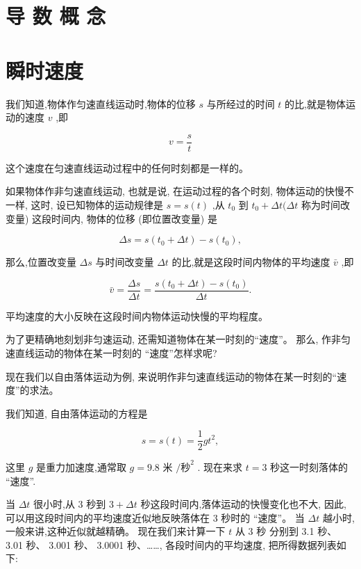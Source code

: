 \documentclass[lang=cn,newtx,12pt,scheme=chinese]{elegantbook}
\begin{document}
\section*{导 数 概 念}

\section{瞬时速度}

我们知道,物体作匀速直线运动时,物体的位移 \(s\) 与所经过的时间 \(t\) 的比,就是物体运动的速度 \(v\) ,即

\[
v = \frac{s}{t}
\]

这个速度在匀速直线运动过程中的任何时刻都是一样的。

如果物体作非匀速直线运动, 也就是说, 在运动过程的各个时刻, 物体运动的快慢不一样, 这时, 设已知物体的运动规律是 \(s = s\left( t\right)\) ,从 \({t}_{0}\) 到 \({t}_{0} + {\Delta t}({\Delta t}\) 称为时间改变量) 这段时间内, 物体的位移 (即位置改变量) 是

\[
{\Delta s} = s\left( {{t}_{0} + {\Delta t}}\right) - s\left( {t}_{0}\right) ,
\]

那么,位置改变量 \({\Delta s}\) 与时间改变量 \({\Delta t}\) 的比,就是这段时间内物体的平均速度 \(\bar{v}\) ,即

\[
\bar{v} = \frac{\Delta s}{\Delta t} = \frac{s\left( {{t}_{0} + {\Delta t}}\right) - s\left( {t}_{0}\right) }{\Delta t}.
\]

平均速度的大小反映在这段时间内物体运动快慢的平均程度。

为了更精确地刻划非匀速运动, 还需知道物体在某一时刻的“速度”。 那么, 作非匀速直线运动的物体在某一时刻的 “速度”怎样求呢?

现在我们以自由落体运动为例, 来说明作非匀速直线运动的物体在某一时刻的“速度”的求法。

我们知道, 自由落体运动的方程是

\[
s = s\left( t\right) = \frac{1}{2}g{t}^{2},
\]

这里 \(g\) 是重力加速度,通常取 \(g = {9.8}\) 米 \(/{\text{秒}}^{2}\) . 现在来求 \(t = 3\) 秒这一时刻落体的 “速度”.

当 \({\Delta t}\) 很小时,从 3 秒到 \(3 + {\Delta t}\) 秒这段时间内,落体运动的快慢变化也不大, 因此, 可以用这段时间内的平均速度近似地反映落体在 3 秒时的 “速度”。 当 \({\Delta t}\) 越小时,一般来讲,这种近似就越精确。 现在我们来计算一下 \(t\) 从 3 秒 分别到 3.1 秒、 3.01 秒、 3.001 秒、 3.0001 秒、……, 各段时间内的平均速度, 把所得数据列表如下:
\end{document}
